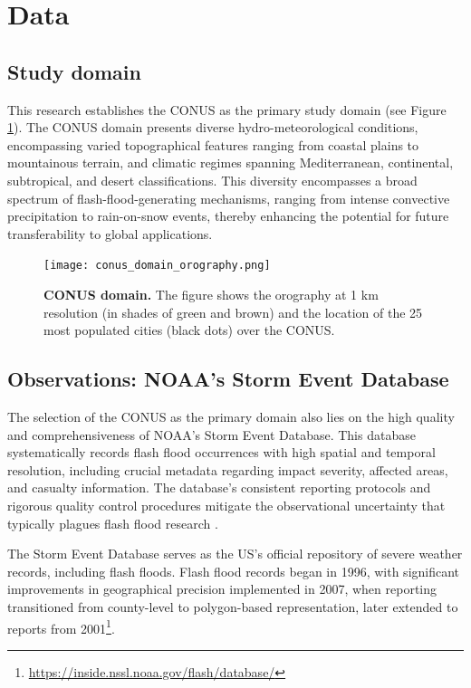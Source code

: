 \section{Data}
\label{flash_flood_focused_verification_rainfall_based_ff_DATA}


\subsection{Study domain}

This research establishes the CONUS as the primary study domain (see Figure \ref{fig:conus_domain}). The CONUS domain presents diverse hydro-meteorological conditions, encompassing varied topographical features ranging from coastal plains to mountainous terrain, and climatic regimes spanning Mediterranean, continental, subtropical, and desert classifications. This diversity encompasses a broad spectrum of flash-flood-generating mechanisms, ranging from intense convective precipitation to rain-on-snow events, thereby enhancing the potential for future transferability to global applications.

\begin{figure}[htbp]
\centering
\texttt{[image: conus\_domain\_orography.png]}
\caption{\textbf{CONUS domain.} The figure shows the orography at 1 km resolution (in shades of green and brown) and the location of the 25 most populated cities (black dots) over the CONUS.}
\label{fig:conus_domain}
\end{figure}

\subsection{Observations: NOAA's Storm Event Database}

The selection of the CONUS as the primary domain also lies on the high quality and comprehensiveness of NOAA's Storm Event Database. This database systematically records flash flood occurrences with high spatial and temporal resolution, including crucial metadata regarding impact severity, affected areas, and casualty information. The database's consistent reporting protocols and rigorous quality control procedures mitigate the observational uncertainty that typically plagues flash flood research \citep{Panwar_2020}.

The Storm Event Database serves as the US's official repository of severe weather records, including flash floods. Flash flood records began in 1996, with significant improvements in geographical precision implemented in 2007, when reporting transitioned from county-level to polygon-based representation, later extended to reports from 2001\footnote{\url{https://inside.nssl.noaa.gov/flash/database/}}.

